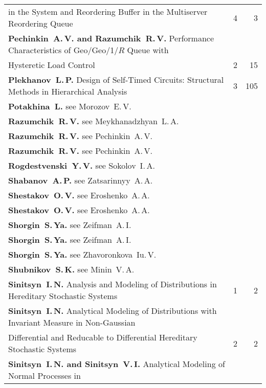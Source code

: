 {\begin{tabular}{p{397pt}rr}
\hspace*{23pt}in the System and Reordering Buffer in the Multiserver Reordering Queue\dotfill&4&3\\[0.65pt]
\textbf{Pechinkin~A.\,V. and Razumchik~R.\,V.} Performance Characteristics of
Geo/Geo/1/$R$ Queue with\linebreak
\vspace*{-12pt}\\[0.65pt]
\hspace*{23pt}Hysteretic Load Control\dotfill&2&15\\[0.65pt]
\textbf{Plekhanov~L.\,P.} Design of Self-Timed Circuits: Structural Methods in Hierarchical
Analysis\dotfill&3&105\\[0.65pt]
\textbf{Potakhina~L.} see Morozov~E.\,V.&&\\[0.65pt]
\textbf{Razumchik~R.\,V.} see Meykhanadzhyan~L.\,A.&&\\[0.65pt]
\textbf{Razumchik~R.\,V.} see Pechinkin~A.\,V.&&\\[0.65pt]
\textbf{Razumchik~R.\,V.} see Pechinkin~A.\,V.&&\\[0.65pt]
\textbf{Rogdestvenski~Y.\,V.} see Sokolov~I.\,A.&&\\[0.65pt]
\textbf{Shabanov~A.\,P.} see Zatsarinnyy~A.\,A.&&\\[0.65pt]
\textbf{Shestakov~O.\,V.} see Eroshenko~A.\,A.&&\\[0.65pt]
\textbf{Shestakov~O.\,V.} see Eroshenko~A.\,A.&&\\[0.65pt]
\textbf{Shorgin~S.\,Ya.} see Zeifman~A.\,I.&&\\[0.65pt]
\textbf{Shorgin~S.\,Ya.} see Zeifman~A.\,I.&&\\[0.65pt]
\textbf{Shorgin~S.\,Ya.} see Zhavoronkova~Iu.\,V.&&\\[0.65pt]
\textbf{Shubnikov~S.\,K.} see Minin~V.\,A.&&\\[0.65pt]
\textbf{Sinitsyn~I.\,N.} Analysis and Modeling of Distributions in Hereditary Stochastic
Systems\dotfill&1&2\\[0.65pt]
\textbf{Sinitsyn~I.\,N.} Analytical Modeling of Distributions with Invariant Measure in
Non-Gaussian\linebreak
\vspace*{-12pt}\\[0.65pt]
\hspace*{23pt}Differential and Reducable to Differential Hereditary Stochastic Systems\dotfill&2&2\\[0.65pt]
\textbf{Sinitsyn~I.\,N. and Sinitsyn~V.\,I.} Analytical Modeling of Normal Processes in

\end{tabular}}
